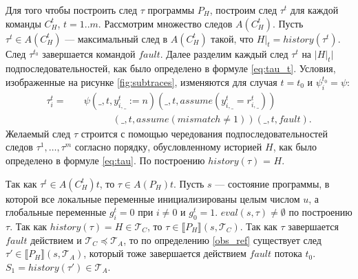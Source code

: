 \begin{myproof}
Для того чтобы построить след $\tau$ программы $P_H$, построим след $\tau^t$ для каждой команды $C^t_H$, $t = 1..m$. Рассмотрим множество следов $A(C^t_H)$. Пусть $\tau^t \in A(C^t_H)$ --- максимальный след в $A(C^t_H)$ такой, что $H|_t = history(\tau^t)$. След $\tau^{t_0}$ завершается командой $fault$. Далее разделим каждый след $\tau^t$ на $|H|_t|$ подпоследовательностей, как было определено в формуле \eqref{eq:tau_t}. Условия, изображенные на рисунке \ref{fig:subtraces}, изменяются для случая $t=t_0$ и $\psi^{t_0}_i = \psi$:
\begin{align}
\tau^t_i = &\quad \psi(\_, t, y^t_{i,\_} := n)(\_, t, assume(y^t_{i,\_} = r^t_{i,\_})) \nonumber \\
&\qquad \qquad (\_, t, assume(mismatch \neq 1))(\_, t, fault). \nonumber
\end{align}
Желаемый след $\tau$ строится с помощью чередования подпоследовательностей следов $\tau^1,\ldots,\tau^m$ согласно порядку, обусловленному историей $H$, как было определено в формуле \eqref{eq:tau}. По построению $history(\tau)$ = $H$.

Так как $\tau^t \in A(C^t_H)t$, то $\tau \in A(P_H)t$. Пусть $s$ --- состояние программы, в которой все локальные переменные инициализированы целым числом $u$, а глобальные переменные $g^t_i = 0$ при $i \neq 0$ и $g^t_0 = 1$. $eval(s,\tau) \neq \emptyset$ по построению $\tau$. Так как $history(\tau) = H \in \mathcal{T}_C$, то $\tau \in \llbracket P_H \rrbracket(s,\mathcal{T}_C)$. Так как $\tau$ завершается $fault$ действием и $\mathcal{T}_C \preceq \mathcal{T}_A$, то по определению \ref{obs_ref} существует след $\tau' \in \llbracket P_H \rrbracket(s,\mathcal{T}_A)$, который тоже завершается действием $fault$ потока $t_0$. $S_1 = history(\tau') \in \mathcal{T}_A$.


\end{myproof}
